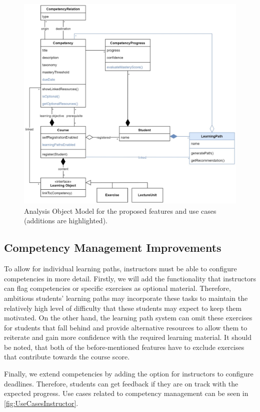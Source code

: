 \documentclass[a4paper,12pt,twoside]{article}
\begin{document}
\begin{figure}[h!]
        \centering
        \includegraphics[width=\linewidth]{figures/AOM.jpg}
        \caption{Analysis Object Model for the proposed features and use cases (additions are highlighted).}
        \label{fig:AOM}
\end{figure}

\subsection{Competency Management Improvements}
To allow for individual learning paths, instructors must be able to configure competencies in more detail. Firstly, we will add the
functionality that instructors can flag competencies or specific exercises as optional material. Therefore, ambitious students' learning paths
may incorporate these tasks to maintain the relatively high level of difficulty that these students may expect to keep them motivated.
On the other hand, the learning path system can omit these exercises for students that fall behind and provide alternative resources to allow them
to reiterate and gain more confidence with the required learning material.
It should be noted, that both of the before-mentioned features have to exclude exercises that contribute towards the course score.

Finally, we extend competencies by adding the option for instructors to configure deadlines. Therefore, students can get feedback if they
are on track with the expected progress. Use cases related to competency management can be seen in \autoref{fig:UseCasesInstructor}.
\end{document}
